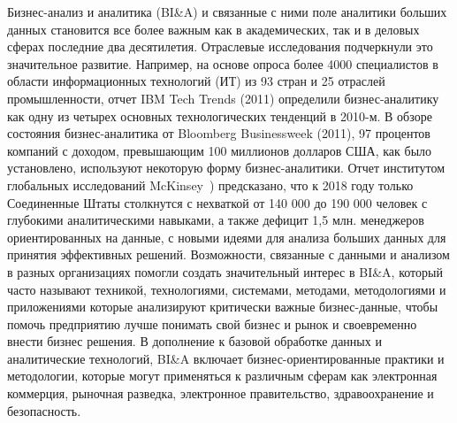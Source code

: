Бизнес-анализ и аналитика (BI\&A) и связанные с ними
поле аналитики больших данных становится все более важным
как в академических, так и в деловых сферах
последние два десятилетия. Отраслевые исследования подчеркнули это
значительное развитие. Например, на основе опроса
более 4000 специалистов в области информационных технологий (ИТ) из 93
стран и 25 отраслей промышленности, отчет IBM Tech Trends
(2011) определили бизнес-аналитику как одну из четырех основных
технологических тенденций в 2010-м. В обзоре состояния
бизнес-аналитика от Bloomberg Businessweek (2011), 97 процентов компаний с доходом, превышающим 100 миллионов долларов США,
как было установлено, используют некоторую форму бизнес-аналитики. Отчет институтом глобальных исследований McKinsey~\cite{Maybury:2004}) предсказано,
что к 2018 году только Соединенные Штаты столкнутся с нехваткой
от 140 000 до 190 000 человек с глубокими аналитическими навыками,
а также дефицит 1,5 млн. менеджеров ориентированных на данные, с
новыми идеями для анализа больших данных для принятия эффективных решений.
Возможности, связанные с данными и анализом в разных
организациях помогли создать значительный интерес
в BI\&A, который часто называют техникой, технологиями,
системами, методами, методологиями и приложениями
которые анализируют критически важные бизнес-данные, чтобы помочь предприятию лучше
понимать свой бизнес и рынок и своевременно внести бизнес
решения. В дополнение к базовой обработке данных и
аналитические технологий, BI\&A включает бизнес-ориентированные
практики и методологии, которые могут применяться к различным
сферам как электронная коммерция, рыночная разведка,
электронное правительство, здравоохранение и безопасность.